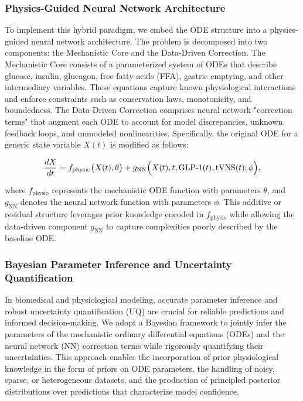 \documentclass[9pt,shortpaper,twoside,web]{ieeecolor}
\begin{document}
\subsubsection{Physics-Guided Neural Network Architecture}
To implement this hybrid paradigm, we embed the ODE structure into a physics-guided neural network architecture. The problem is decomposed into two components: the Mechanistic Core and the Data-Driven Correction. The Mechanistic Core consists of a parameterized system of ODEs that describe glucose, insulin, glucagon, free fatty acids (FFA), gastric emptying, and other intermediary variables. These equations capture known physiological interactions and enforce constraints such as conservation laws, monotonicity, and boundedness. The Data-Driven Correction comprises neural network "correction terms" that augment each ODE to account for model discrepancies, unknown feedback loops, and unmodeled nonlinearities. Specifically, the original ODE for a generic state variable \(X(t)\) is modified as follows:

\begin{equation}
\frac{dX}{dt} = f_{\text{physio}}\bigl(X(t), \theta\bigr) + g_{\text{NN}}\Bigl(X(t), t, \text{GLP-1}(t), \text{tVNS}(t); \phi \Bigr),
\end{equation}

where \(f_{\text{physio}}\) represents the mechanistic ODE function with parameters \(\theta\), and \(g_{\text{NN}}\) denotes the neural network function with parameters \(\phi\). This additive or residual structure leverages prior knowledge encoded in \(f_{\text{physio}}\) while allowing the data-driven component \(g_{\text{NN}}\) to capture complexities poorly described by the baseline ODE.

\subsubsection{Bayesian Parameter Inference and Uncertainty Quantification}
\label{sec:bayesian_inference}

In biomedical and physiological modeling, accurate parameter inference and robust uncertainty quantification (UQ) are crucial for reliable predictions and informed decision-making. We adopt a Bayesian framework to jointly infer the parameters of the mechanistic ordinary differential equations (ODEs) and the neural network (NN) correction terms while rigorously quantifying their uncertainties. This approach enables the incorporation of prior physiological knowledge in the form of priors on ODE parameters, the handling of noisy, sparse, or heterogeneous datasets, and the production of principled posterior distributions over predictions that characterize model confidence.
\end{document}
